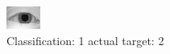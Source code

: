 \begin{figure}[h!]
\begin{center}
\includegraphics[width=0.60\columnwidth]{figures/ID875_class_1_target_2.png}
\end{center}
\caption{ Classification: 1 actual target: 2}
\label{fig:ID875_class_1_target_2}
\end{figure}
